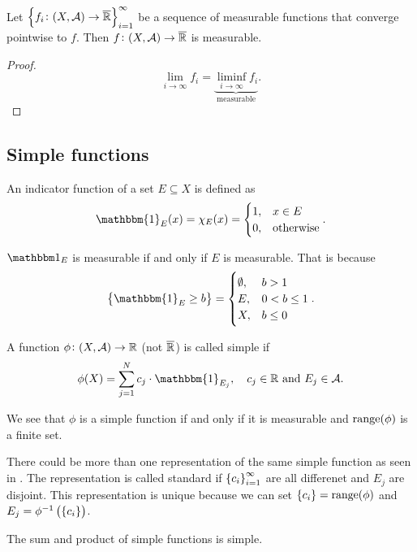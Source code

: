 \documentclass[11pt,a4paper]{article}
\newcommand{\A}{\mathcal A}
\begin{document}
\begin{corollary}
  Let $\set{f_i \colon (X,\A) \to \overline \R}_{i=1}^{\infty}$ be a sequence
  of measurable functions that converge pointwise to $f$.
  Then $f \colon (X,\A) \to \overline \R$ is measurable.
\end{corollary}
\begin{proof}
  \[
    \lim_{i \to \infty} f_i =
    \underbrace{\liminf_{i \to \infty} f_i}_{\text{measurable}}.
  \]
\end{proof}

\subsection{Simple functions}
\begin{definition}
  An indicator function of a set $E \subseteq X$ is defined as
  \[
    \mathbbm{1}_E(x) =
    \chi_E(x) =
    \begin{cases}
      1, &x \in E \\
      0, &\text{otherwise}
    \end{cases}.
  \]
\end{definition}
\begin{remark}
  $\mathbbm 1_E$ is measurable if and only if $E$ is measurable.
  That is because
  \[
    \set{\mathbbm{1}_{E} \geq b} =
    \begin{cases}
      \emptyset, &b > 1 \\
      E, &0 < b \le 1 \\
      X, &b \le 0
    \end{cases}.
  \]
\end{remark}

\begin{definition}
  \label{def:simple-function}
  A function $\phi \colon (X,\A) \to \R$ (not $\overline{\mathbb{R}}$)
  is called simple if
  \[
    \phi(X) =
    \sum_{j=1}^{N} c_j \cdot \mathbbm{1}_{E_j}, \quad
    c_j \in \R \stand E_j \in \A.
  \]
\end{definition}
\begin{remark}
  We see that $\phi$ is a simple function if and only if it is measurable
  and $\operatorname{range}(\phi)$ is a finite set.
\end{remark}
\begin{remark}
  There could be more than one representation of the same simple function
  as seen in .
  The representation is called standard if $\left\{c_i\right\}_{i=1}^{\infty}$ are all
  differenet and $E_j$ are disjoint.
  This representation is unique because we can set
  $\left\{c_i\right\} = \operatorname{range}(\phi)$ and $E_j = \phi^{-1}\del{\set{c_i}}$.
\end{remark}
\begin{remark}
  The sum and product of simple functions is simple.
\end{remark}
\end{document}
